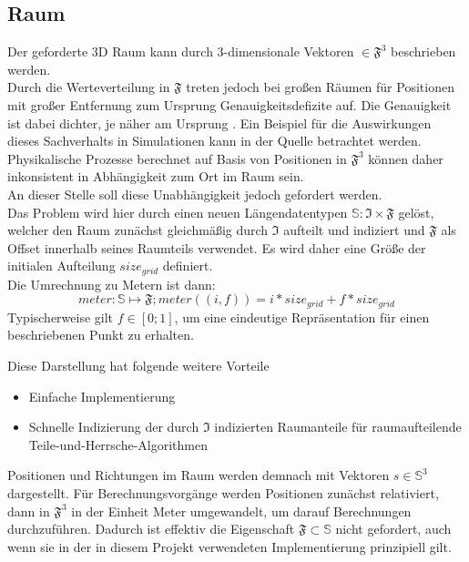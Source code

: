 \subsection{Raum}
\label{sec:space}
Der geforderte 3D Raum kann durch 3-dimensionale Vektoren $\in \mathfrak{F}^3$ beschrieben werden.\\
Durch die Werteverteilung in $\mathfrak{F}$ treten jedoch bei großen Räumen für Positionen mit großer Entfernung zum Ursprung Genauigkeitsdefizite auf. Die Genauigkeit ist dabei dichter, je näher am Ursprung \cite{floatdistribution}. Ein Beispiel für die Auswirkungen dieses Sachverhalts in Simulationen kann in der Quelle \cite{floatdistributionexample} betrachtet werden.\\
Physikalische Prozesse berechnet auf Basis von Positionen in $\mathfrak{F}^3$ können daher inkonsistent in Abhängigkeit zum Ort im Raum sein.\\
An dieser Stelle soll diese Unabhängigkeit jedoch gefordert werden.\\
Das Problem wird hier durch einen neuen Längendatentypen $\mathbb{S} : \mathfrak{I} \times \mathfrak{F}$ gelöst, welcher den Raum zunächst gleichmäßig durch $\mathfrak{I}$ aufteilt und indiziert und $\mathfrak{F}$ als Offset innerhalb seines Raumteils verwendet. Es wird daher eine Größe der initialen Aufteilung $size_{grid}$ definiert.\\
Die Umrechnung zu Metern ist dann: $$ meter: \mathbb{S} \mapsto \mathfrak{F};  meter((i, f)) = i * size_{grid} + f * size_{grid}$$ 
Typischerweise gilt $f \in [0;1]$, um eine eindeutige Repräsentation für einen beschriebenen Punkt zu erhalten.

Diese Darstellung hat folgende weitere Vorteile
\begin{itemize}
\item Einfache Implementierung
\item Schnelle Indizierung der durch $\mathfrak{I}$ indizierten Raumanteile für raumaufteilende Teile-und-Herrsche-Algorithmen
\end{itemize}

Positionen und Richtungen im Raum werden demnach mit Vektoren $s\in\mathbb{S}^3$ dargestellt. Für Berechnungsvorgänge werden Positionen zunächst relativiert, dann in $\mathfrak{F}^3$ in der Einheit Meter umgewandelt, um darauf Berechnungen durchzuführen. Dadurch ist effektiv die Eigenschaft $\mathfrak{F}\subset\mathbb{S}$ nicht gefordert, auch wenn sie in der in diesem Projekt verwendeten Implementierung prinzipiell gilt.

